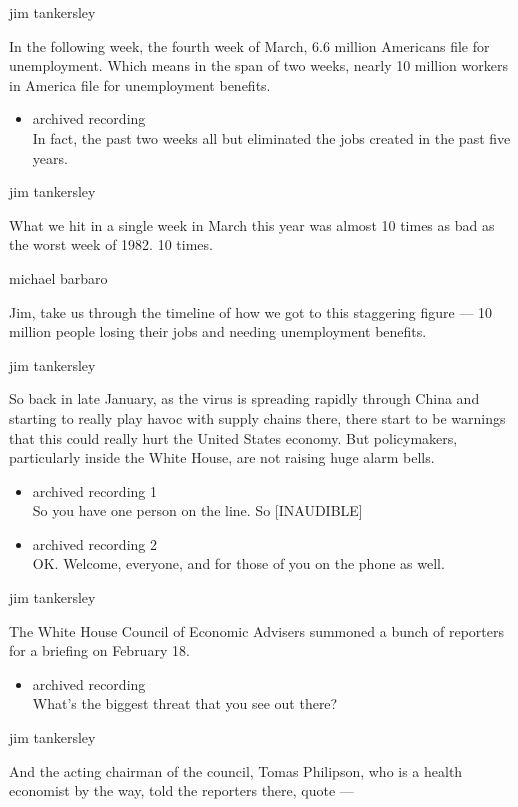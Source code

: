 jim tankersley

In the following week, the fourth week of March, 6.6 million Americans
file for unemployment. Which means in the span of two weeks, nearly 10
million workers in America file for unemployment benefits.

\begin{itemize}
\tightlist
\item
  archived recording\\
  In fact, the past two weeks all but eliminated the jobs created in the
  past five years.
\end{itemize}

jim tankersley

What we hit in a single week in March this year was almost 10 times as
bad as the worst week of 1982. 10 times.

michael barbaro

Jim, take us through the timeline of how we got to this staggering
figure --- 10 million people losing their jobs and needing unemployment
benefits.

jim tankersley

So back in late January, as the virus is spreading rapidly through China
and starting to really play havoc with supply chains there, there start
to be warnings that this could really hurt the United States economy.
But policymakers, particularly inside the White House, are not raising
huge alarm bells.

\begin{itemize}
\item
  archived recording 1\\
  So you have one person on the line. So {[}INAUDIBLE{]}
\item
  archived recording 2\\
  OK. Welcome, everyone, and for those of you on the phone as well.
\end{itemize}

jim tankersley

The White House Council of Economic Advisers summoned a bunch of
reporters for a briefing on February 18.

\begin{itemize}
\tightlist
\item
  archived recording\\
  What's the biggest threat that you see out there?
\end{itemize}

jim tankersley

And the acting chairman of the council, Tomas Philipson, who is a health
economist by the way, told the reporters there, quote ---

